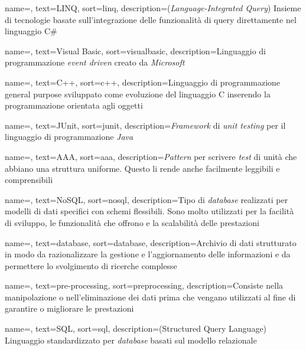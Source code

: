 {
    name=,
    text=LINQ,
    sort=linq,
    description={(\textit{Language-Integrated Query})
    Insieme di tecnologie basate sull'integrazione delle funzionalità di query direttamente nel linguaggio C\# \cite{site:wiki}}
}

{
    name=,
    text=Visual Basic,
    sort=visualbasic,
    description={Linguaggio di programmazione \textit{event driven} creato da \textit{Microsoft} \cite{site:wiki}}
}

{
    name=,
    text=C++,
    sort=c++,
    description={Linguaggio di programmazione
    general purpose sviluppato come evoluzione del linguaggio C inserendo la programmazione orientata agli oggetti}
}

{
    name=,
    text=JUnit,
    sort=junit,
    description={\textit{Framework} di \textit{unit testing} per il linguaggio di programmazione \textit{Java}}
}

{
    name=,
    text=AAA,
    sort=aaa,
    description={\textit{Pattern} per scrivere \textit{test} di unità che abbiano una struttura uniforme. Questo li rende anche facilmente leggibili e comprensibili}
}

{
    name=,
    text=NoSQL,
    sort=nosql,
    description={Tipo di \textit{database} realizzati per modelli di dati specifici con schemi flessibili. Sono molto utilizzati per la facilità di sviluppo, le funzionalità che offrono e la scalabilità delle prestazioni \cite{site:wiki}}
}

{
    name=,
    text=database,
    sort=database,
    description={Archivio di dati strutturato in modo da razionalizzare la gestione e l'aggiornamento delle informazioni e da permettere lo svolgimento di ricerche complesse \cite{site:def-db}}
}

{
    name=,
    text=pre-processing,
    sort=preprocessing,
    description={Consiste nella manipolazione o nell'eliminazione
    dei dati prima che vengano utilizzati al fine di
    garantire o migliorare le prestazioni \cite{site:wiki}}
}

{
    name=,
    text=SQL,
    sort=sql,
    description={(Structured Query Language) Linguaggio standardizzato per \textit{database} basati sul modello relazionale}
}

